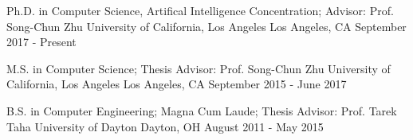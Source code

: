


\begin{cventries}


\cventry
{Ph.D. in Computer Science, Artifical Intelligence Concentration; Advisor: Prof. Song-Chun Zhu}
{University of California, Los Angeles} %
{Los Angeles, CA} %
{September 2017 - Present} %
{ %
}
\vspace{-3mm}


\cventry
{M.S. in Computer Science; Thesis Advisor: Prof. Song-Chun Zhu}
{University of California, Los Angeles} %
{Los Angeles, CA} %
{September 2015 - June 2017} %
{ %
}
\vspace{-3mm}


\cventry
{B.S. in Computer Engineering; Magna Cum Laude; Thesis Advisor: Prof. Tarek Taha}
{University of Dayton} %
{Dayton, OH} %
{August 2011 - May 2015} %
{ %
}
\vspace{-5.5mm}


\end{cventries}